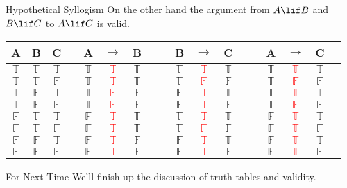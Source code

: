 \documentclass[
  ignorenonframetext,
]{beamer}
\renewcommand{\,}{\text{, }}
\def\True{\mathbb{T}}
\def\False{\mathbb{F}}
\begin{document}
\begin{frame}{Hypothetical Syllogism}
\protect\hypertarget{hypothetical-syllogism}{}
On the other hand the argument from \(A \lif B\) and \(B \lif C\) to
\(A \lif C\) is valid.

\begin{center}

\begin{tabular}{@{ }c@{ }@{ }c@{ }@{ }c | c@{ }@{ }c@{ }@{ }c@{ }@{ }c@{ }@{ }c | c@{ }@{ }c@{ }@{ }c@{ }@{ }c@{ }@{ }c | c@{ }@{ }c@{ }@{ }c@{ }@{ }c@{ }@{ }c}
A & B & C &  & A & $\rightarrow$ & B &  &  & B & $\rightarrow$ & C &  &  & A & $\rightarrow$ & C & \\
\hline 
$\True$ & $\True$ & $\True$ &  & $\True$ & \textcolor{red}{$\True$} & $\True$ &  &  & $\True$ & \textcolor{red}{$\True$} & $\True$ &  &  & $\True$ & \textcolor{red}{$\True$} & $\True$ & \\
$\True$ & $\True$ & $\False$ &  & $\True$ & \textcolor{red}{$\True$} & $\True$ &  &  & $\True$ & \textcolor{red}{$\False$} & $\False$ &  &  & $\True$ & \textcolor{red}{$\False$} & $\False$ & \\
$\True$ & $\False$ & $\True$ &  & $\True$ & \textcolor{red}{$\False$} & $\False$ &  &  & $\False$ & \textcolor{red}{$\True$} & $\True$ &  &  & $\True$ & \textcolor{red}{$\True$} & $\True$ & \\
$\True$ & $\False$ & $\False$ &  & $\True$ & \textcolor{red}{$\False$} & $\False$ &  &  & $\False$ & \textcolor{red}{$\True$} & $\False$ &  &  & $\True$ & \textcolor{red}{$\False$} & $\False$ & \\
$\False$ & $\True$ & $\True$ &  & $\False$ & \textcolor{red}{$\True$} & $\True$ &  &  & $\True$ & \textcolor{red}{$\True$} & $\True$ &  &  & $\False$ & \textcolor{red}{$\True$} & $\True$ & \\
$\False$ & $\True$ & $\False$ &  & $\False$ & \textcolor{red}{$\True$} & $\True$ &  &  & $\True$ & \textcolor{red}{$\False$} & $\False$ &  &  & $\False$ & \textcolor{red}{$\True$} & $\False$ & \\
$\False$ & $\False$ & $\True$ &  & $\False$ & \textcolor{red}{$\True$} & $\False$ &  &  & $\False$ & \textcolor{red}{$\True$} & $\True$ &  &  & $\False$ & \textcolor{red}{$\True$} & $\True$ & \\
$\False$ & $\False$ & $\False$ &  & $\False$ & \textcolor{red}{$\True$} & $\False$ &  &  & $\False$ & \textcolor{red}{$\True$} & $\False$ &  &  & $\False$ & \textcolor{red}{$\True$} & $\False$ & \\
\end{tabular}
\end{center}
\end{frame}

\begin{frame}{For Next Time}
\protect\hypertarget{for-next-time}{}
We'll finish up the discussion of truth tables and validity.
\end{frame}
\end{document}
